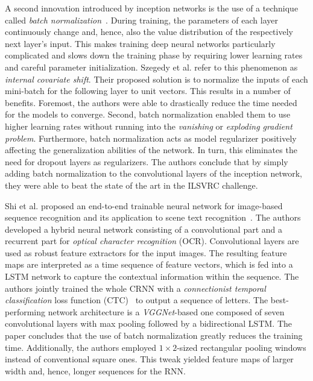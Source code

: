 A second innovation introduced by inception networks is the use of a technique called \emph{batch normalization}~\cite{ioffe2015batch}. During training, the parameters of each layer continuously change and, hence, also the value distribution of the respectively next layer's input. This makes training deep neural networks particularly complicated and slows down the training phase by requiring lower learning rates and careful parameter initialization. Szegedy et al. refer to this phenomenon as \emph{internal covariate shift}. Their proposed solution is to normalize the inputs of each mini-batch for the following layer to unit vectors. This results in a number of benefits. Foremost, the authors were able to drastically reduce the time needed for the models to converge. Second, batch normalization enabled them to use higher learning rates without running into the \emph{vanishing} or \emph{exploding gradient problem}. Furthermore, batch normalization acts as model regularizer positively affecting the generalization abilities of the network. In turn, this eliminates the need for dropout layers as regularizers. The authors conclude that by simply adding batch normalization to the convolutional layers of the inception network, they were able to beat the state of the art in the ILSVRC challenge.

Shi et al. proposed an end-to-end trainable neural network for image-based sequence recognition and its application to scene text recognition~\cite{shi2016end}. The authors developed a hybrid neural network consisting of a convolutional part and a recurrent part for \emph{optical character recognition} (OCR). Convolutional layers are used as robust feature extractors for the input images. The resulting feature maps are interpreted as a time sequence of feature vectors, which is fed into a LSTM network to capture the contextual information within the sequence. The authors jointly trained the whole CRNN with a \emph{connectionist temporal classification} loss function (CTC)~\cite{graves2006connectionist} to output a sequence of letters. The best-performing network architecture is a \emph{VGGNet}-based one composed of seven convolutional layers with max pooling followed by a bidirectional LSTM. The paper concludes that the use of batch normalization greatly reduces the training time. Additionally, the authors employed $1 \times 2$-sized rectangular pooling windows instead of conventional square ones. This tweak yielded feature maps of larger width and, hence, longer sequences for the RNN.


